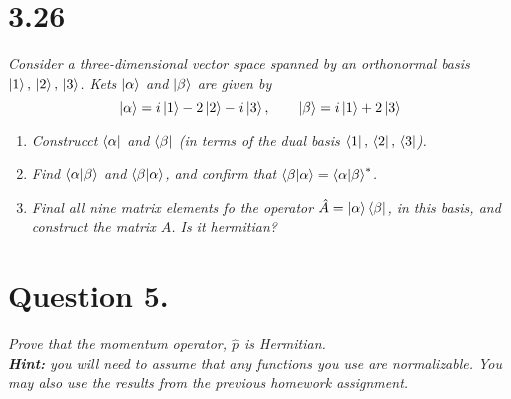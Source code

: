 \documentclass[12pt]{article}
\begin{document}
\newpage

\section*{3.26}
\emph{Consider a three-dimensional vector space spanned by an orthonormal basis $\ket{1},\,\ket{2},\,\ket{3}$. Kets $\ket{\alpha}$ and $\ket{\beta}$ are given by}
 \[\ket{\alpha} = i\ket{1} -2\ket{2}-i\ket{3}, \qquad \ket{\beta} = i\ket{1} + 2\ket{3}\]
\begin{enumerate}[label=\alph*)]
\item \emph{Construcct $\bra{\alpha}$ and $\bra{\beta}$ (in terms of the dual basis $\bra{1},\,\bra{2},\,\bra{3}$).}\bigskip

\item \emph{Find $\braket{\alpha}{\beta}$ and $\braket{\beta}{\alpha}$, and confirm that $\braket{\beta}{\alpha} = \braket{\alpha}{\beta}^*$.}\bigskip

\item \emph{Final all nine matrix elements fo the operator $\hat{A} = \ket{\alpha}\bra{\beta}$, in this basis, and construct the matrix $A$. Is it hermitian?}
\end{enumerate}

\newpage

\section*{Question 5.}
\emph{Prove that the momentum operator, $\hat{p}$ is Hermitian.}\\
\emph{\textbf{Hint:} you will need to assume that any functions you use are normalizable. You may also use the results from the previous homework assignment.}\bigskip

\newpage
\end{document}
